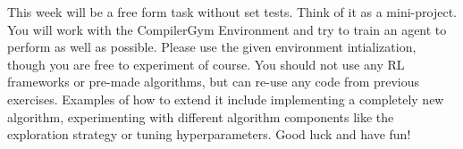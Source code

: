 \documentclass{exam}
\begin{document}
\noindent This week will be a free form task without set tests. Think of it as a mini-project. You will work with the CompilerGym Environment and try to train an agent to perform as well as possible. Please use the given environment intialization, though you are free to experiment of course. You should not use any RL frameworks or pre-made algorithms, but can re-use any code from previous exercises. Examples of how to extend it include implementing a completely new algorithm, experimenting with different algorithm components like the exploration strategy or tuning hyperparameters. Good luck and have fun!
\end{document}
